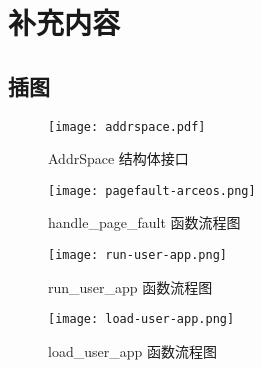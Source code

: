 
\chapter{补充内容}

\section{插图}

\begin{figure}[H]
    \centering
    \texttt{[image: addrspace.pdf]}
    \caption{AddrSpace 结构体接口}
    \label{fig:AddrSpace}
\end{figure}

\begin{figure}
    \centering
    \texttt{[image: pagefault-arceos.png]}
    \caption{handle\_page\_fault 函数流程图}
    \label{fig:handle-page-fault-arceos}
\end{figure}


\begin{figure}
\centering %
\begin{minipage}[b]{0.3\textwidth} %
\centering %
\texttt{[image: run-user-app.png]} %
\caption{run\_user\_app 函数流程图}
\label{fig:run-user-app}
\end{minipage}
\begin{minipage}[b]{0.65\textwidth} %
\centering %
\texttt{[image: load-user-app.png]}%
\caption{load\_user\_app 函数流程图}
\label{fig:load-user-app}
\end{minipage}
\end{figure}